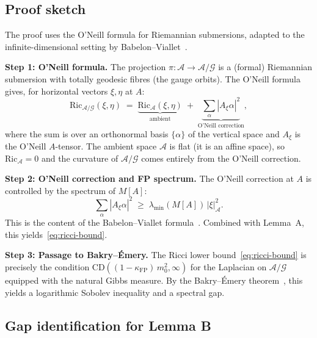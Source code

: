 \documentclass[11pt,a4paper]{amsart}
\theoremstyle{definition}
\theoremstyle{remark}
\newcommand{\calA}{\mathcal{A}}
\newcommand{\calG}{\mathcal{G}}
\newcommand{\Ric}{\mathrm{Ric}}
\newcommand{\kFP}{\kappa_{\mathrm{FP}}}
\begin{document}
\subsection{Proof sketch}

The proof uses the O'Neill formula for Riemannian submersions, adapted to
the infinite-dimensional setting by Babelon--Viallet~\cite{BabelonViallet1981}.

\medskip
\noindent
\textbf{Step 1: O'Neill formula.}
The projection $\pi: \calA \to \calA/\calG$ is a (formal) Riemannian
submersion with totally geodesic fibres (the gauge orbits). The O'Neill
formula gives, for horizontal vectors $\xi, \eta$ at $A$:
\begin{equation}\label{eq:oneill}
\Ric_{\calA/\calG}(\xi, \eta) \;=\;
\underbrace{\Ric_\calA(\xi, \eta)}_{\text{ambient}} \;+\;
\underbrace{\sum_\alpha |A_\xi \alpha|^2}_{\text{O'Neill correction}},
\end{equation}
where the sum is over an orthonormal basis $\{\alpha\}$ of the vertical
space and $A_\xi$ is the O'Neill $A$-tensor. The ambient space $\calA$
is flat (it is an affine space), so $\Ric_\calA = 0$ and the curvature
of $\calA/\calG$ comes entirely from the O'Neill correction.

\medskip
\noindent
\textbf{Step 2: O'Neill correction and FP spectrum.}
The O'Neill correction at $A$ is controlled by the spectrum of $M[A]$:
\[
\sum_\alpha |A_\xi \alpha|^2 \;\geq\;
\lambda_{\min}(M[A])\,|\xi|^2_\calA.
\]
This is the content of the Babelon--Viallet formula~\cite[Eq.~(4.5)]{BabelonViallet1981}.
Combined with Lemma~A, this yields~\eqref{eq:ricci-bound}.

\medskip
\noindent
\textbf{Step 3: Passage to Bakry--\'Emery.}
The Ricci lower bound~\eqref{eq:ricci-bound} is precisely the condition
$\mathrm{CD}((1-\kFP)\,m_0^2, \infty)$ for the Laplacian on $\calA/\calG$
equipped with the natural Gibbs measure. By the Bakry--\'Emery
theorem~\cite{BakryEmery1985}, this yields a logarithmic Sobolev inequality
and a spectral gap.

\subsection{Gap identification for Lemma B}
\end{document}

